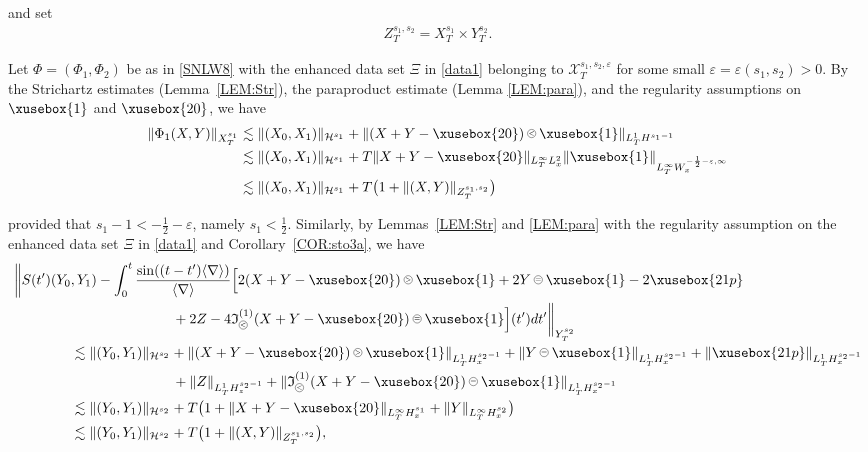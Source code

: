 \documentclass[%
11pt,  reqno]{amsart}
\def\<#1>{\xusebox{#1}}
\newcommand{\pe}{\mathbin{\scaleobj{0.7}{\tikz \draw (0,0) node[shape=circle,draw,inner sep=0pt,minimum size=8.5pt] {\scriptsize  $=$};}}}
\newcommand{\pl}{\mathbin{\scaleobj{0.7}{\tikz \draw (0,0) node[shape=circle,draw,inner sep=0pt,minimum size=8.5pt] {\scriptsize $<$};}}}
\newcommand{\pg}{\mathbin{\scaleobj{0.7}{\tikz \draw (0,0) node[shape=circle,draw,inner sep=0pt,minimum size=8.5pt] {\scriptsize $>$};}}}
\newcommand{\1}{\hspace{0.2mm}\text{I}\hspace{0.2mm}}
\newcommand{\noi}{\noindent}
\newcommand{\nb}{\nabla}
\newcommand{\eps}{\varepsilon}
\newcommand{\les}{\lesssim}
\newcommand{\jb}[1]
{\langle #1 \rangle}
\renewcommand{\H}{\mathcal{H}}
\newcommand{\If}{\mathfrak{I}}
\numberwithin{equation}{section}
\numberwithin{theorem}{section}
\begin{document}
\noi
and set 
\begin{align*}
Z^{s_1, s_2}_T =  X^{s_1}_T\times  Y^{s_2}_T.
\end{align*}





Let $\Phi = (\Phi_1, \Phi_2)$ be as in \eqref{SNLW8}
with the enhanced data set $\Xi$ in \eqref{data1}
belonging to $\mathcal{X}^{s_1, s_2, \eps}_T$
for some small $\eps = \eps(s_1, s_2)> 0$.
By the Strichartz estimates (Lemma~\ref{LEM:Str}), 
 the paraproduct estimate (Lemma \ref{LEM:para}), 
 and the regularity assumptions on $\<1>$ and $\<20>$, we have 
\begin{align}
\| \Phi_1(X, Y) \|_{X^{s_1}_T}
& \les \| (X_0, X_1) \|_{\H^{s_1}}
+  \|(X+Y-\<20>)\pl \<1>\|_{L^1_T H^{s_1 - 1}}\notag\\
& \les \| (X_0, X_1) \|_{\H^{s_1}}
+  T \|X+Y-\<20>\|_{L^\infty_{T}L^2_x} \| \<1>\|_{L^\infty_T W_x^{-\frac 12 -\eps, \infty}}\notag \\
& \les \| (X_0, X_1) \|_{\H^{s_1}}
+  T \big( 1 + \|(X, Y)\|_{Z^{s_1, s_2}_T} \big)
\label{M1}
\end{align}


\noi
provided that $s_1 - 1 < -\frac 12-\eps$, namely $s_1 < \frac 12$.
Similarly, 
by Lemmas~\ref{LEM:Str} and \ref{LEM:para}
with the regularity assumption on the enhanced data set
 $\Xi$ in \eqref{data1} and Corollary~\ref{COR:sto3a}, 
we have
\begin{align}
\bigg\| S(t')(Y_0 & , Y_1)  -  \int_0^t   \frac{\sin((t-t')\jb{\nb})}{\jb{\nb} }
\Big[ 2(X+Y-\<20>)\pg \<1> + 2  Y\pe \<1> - 2 \<21p> \notag\\
& \hphantom{XXXXXXXX}
 + 2Z
-4 \If_{\pl}^{(1)}(X + Y - \<20>)\pe \<1>\Big](t') dt' \bigg\|_{Y^{s_2}_T}\notag\\
& \les 
\| (Y_0, Y_1) \|_{\H^{s_2}}
+ 
 \|(X+Y-\<20>)\pg \<1>\|_{L^1_T H^{s_2 -1 }_x} +  
\| Y\pe \<1>\|_{L^1_T H^{s_2 -1 }_x} 
+ \| \<21p>\|_{L^1_T H^{s_2 -1 }_x} \notag\\ 
& \hphantom{XXXXXXXX}
+ \|Z\|_{L^1_T H^{s_2-1}_z}
+ \| \If_{\pl}^{(1)}(X + Y - \<20>)\pe \<1>\|_{L^1_T H^{s_2 -1 }_x}
\notag\\
& \les 
 \| (Y_0, Y_1) \|_{\H^{s_2}}
+  T\big( 1 + \|X+Y-\<20>\|_{L^\infty_T H^{s_1 }_x} +  
\| Y\|_{L^\infty_T H^{s_2  }_x} \big) \notag\\ 
& \les 
 \| (Y_0, Y_1) \|_{\H^{s_2}}
+ T \big( 1 + \|(X, Y)\|_{Z^{s_1, s_2}_T} \big), 
\label{M2}
\end{align}
\end{document}
